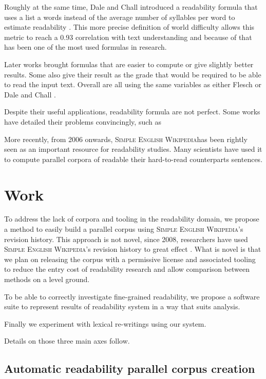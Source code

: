 \documentclass[a4paper, 11pt]{scrreprt}
\newcommand\sew{\textsc{Simple English Wikipedia}}
\begin{document}
Roughly at the same time, Dale and Chall introduced a readability
formula that uses a list a words instead of the average number of
syllables per word to estimate readability
\cite{dale1948formula}. This more precise definition of world
difficulty allows this metric to reach a 0.93 correlation with text
understanding and because of that has been one of the most used
formulas in research.

Later works brought formulas that are easier to compute or give
slightly better results. Some also give their result as the grade that
would be required to be able to read the input text. Overall are all
using the same variables as either Flesch or Dale and Chall
\cite{mclaughlin1969smog, kincaid1975derivation,
  chall1995readability}.

Despite their useful applications, readability formula are not
perfect. Some works have detailed their problems convincingly, such as
\cite{bailin2001linguistic}

More recently, from 2006 onwards, \sew has been
rightly seen as an important resource for readability studies. Many
scientists have used it to compute parallel corpora of readable their
hard-to-read counterparts sentences.

\chapter{Work}
\label{cha:work}

To address the lack of corpora and tooling in the readability domain,
we propose a method to easily build a parallel corpus using \sew's
revision history. This approach is not novel, since 2008, researchers
have used \sew's revision history to great effect
\cite{nelken2008mining}. What is novel is that we plan on releasing
the corpus with a permissive license and associated tooling to reduce
the entry cost of readability research and allow comparison between
methods on a level ground.

To be able to correctly investigate fine-grained readability, we
propose a software suite to represent results of readability system in
a way that suits analysis.

Finally we experiment with lexical re-writings using our system.

Details on those three main axes follow.

\section{Automatic readability parallel corpus creation}
\label{sec:corpus}
\end{document}
